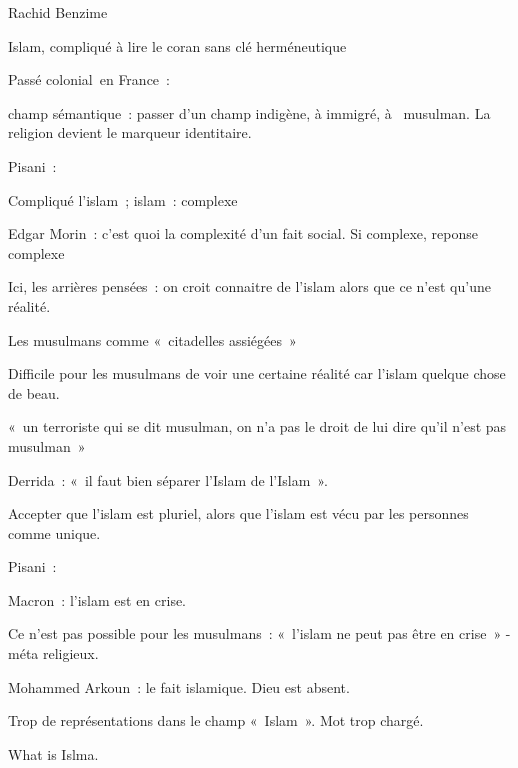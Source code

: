 Rachid Benzime

Islam, compliqué à lire le coran sans clé herméneutique

Passé colonial~en France~:

champ sémantique~: passer d'un champ indigène, à immigré, à ~musulman.
La religion devient le marqueur identitaire.

Pisani~:

Compliqué l'islam~; islam~: complexe

Edgar Morin~: c'est quoi la complexité d'un fait social. Si complexe,
reponse complexe

Ici, les arrières pensées~: on croit connaitre de l'islam alors que ce
n'est qu'une réalité.

Les musulmans comme «~citadelles assiégées~»

Difficile pour les musulmans de voir une certaine réalité car l'islam
quelque chose de beau.

«~un terroriste qui se dit musulman, on n'a pas le droit de lui dire
qu'il n'est pas musulman~»

Derrida~: «~il faut bien séparer l'Islam de l'Islam~».

Accepter que l'islam est pluriel, alors que l'islam est vécu par les
personnes comme unique.

Pisani~:

Macron~: l'islam est en crise.

Ce n'est pas possible pour les musulmans~: «~l'islam ne peut pas être en
crise~» - méta religieux.

Mohammed Arkoun~: le fait islamique. Dieu est absent.

Trop de représentations dans le champ «~Islam~». Mot trop chargé.

What is Islma.
